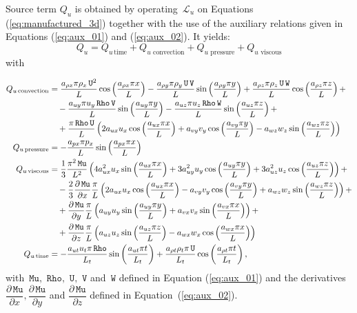 \documentclass[10pt]{article}
\newcommand{\diff}[2] {\dfrac{\partial #1}{\partial #2}}
\newcommand{\Rho}{\,\mathtt{Rho}}
\newcommand{\U}{\,\mathtt{U}}
\newcommand{\V}{\,\mathtt{V}}
\newcommand{\W}{\,\mathtt{W}}
\newcommand{\Lo}{\,\mathcal{L}}
\newcommand{\Mu}{\,\mathtt{Mu}}
\newcommand{\DMuDx}{\diff{\Mu}{x}}
\newcommand{\DMuDy}{\diff{\Mu}{y}}
\newcommand{\DMuDz}{\diff{\Mu}{z}}
\newcommand{\timee}{\,\text{time}}
\newcommand{\convection}{\,\text{convection}}
\newcommand{\viscous}{\,\text{viscous}}
\newcommand{\pressure}{\,\text{pressure}}
\begin{document}
Source term $Q_u$ is obtained by operating $\Lo_{u}$ on Equations  (\ref{eq:manufactured_3d}) together with the use of the  auxiliary relations given in Equations (\ref{eq:aux_01}) and (\ref{eq:aux_02}). It yields:
\begin{equation*}
 Q_u = Q_{u \, \text{time}}+Q_{u \, \convection}+Q_{u \, \pressure }+Q_{u \, \viscous }
\end{equation*}
with

\begin{equation*}
\begin{split}
 Q_{u \convection} &= \dfrac{a_{\rho x} \pi \rho_x \U^2 }{L} \cos\left(\dfrac{a_{\rho x} \pi x}{L}\right)
-\dfrac{a_{\rho y} \pi \rho_y \U \V }{L} \sin\left(\dfrac{a_{\rho y} \pi y}{L}\right)
+\dfrac{a_{\rho z} \pi \rho_z \U \W }{L} \cos\left(\dfrac{a_{\rho z} \pi z}{L}\right)+\\
  &\quad
-\dfrac{a_{uy} \pi u_y \Rho \V }{L} \sin\left(\dfrac{a_{uy} \pi y}{L}\right)
-\dfrac{a_{uz} \pi u_z \Rho \W }{L} \sin\left(\dfrac{a_{uz} \pi z}{L}\right)+\\
  &\quad
+\dfrac{\pi \Rho \U}{L} \left(2 a_{ux} u_x \cos\left(\dfrac{a_{ux} \pi x}{L}\right)+a_{vy} v_y \cos\left(\dfrac{a_{vy} \pi y}{L}\right)-a_{wz} w_z \sin\left(\dfrac{a_{wz} \pi z}{L}\right)\right)  \\ \vspace{15pt}
%
Q_{u \pressure} &= -\dfrac{a_{px} \pi p_x}{L} \sin\left(\dfrac{a_{px} \pi x}{L}\right) \\ \vspace{15pt}
%
Q_{u \viscous} &= \dfrac{1}{3} \dfrac{\pi^2 \Mu}{L^2}\left(4 a_{ux}^2 u_x \sin\left(\dfrac{a_{ux} \pi x}{L}\right)+3 a_{uy}^2 u_y \cos\left(\dfrac{a_{uy} \pi y}{L}\right)+3 a_{uz}^2 u_z \cos\left(\dfrac{a_{uz} \pi z}{L}\right)\right) +\\
  &\quad - \dfrac{2}{3}  \DMuDx \dfrac{\pi}{L}\left(2 a_{ux} u_x \cos\left(\dfrac{a_{ux} \pi x}{L}\right)-a_{vy} v_y \cos\left(\dfrac{a_{vy} \pi y}{L}\right)+a_{wz} w_z \sin\left(\dfrac{a_{wz} \pi z}{L}\right)\right) +\\
  &\quad + \DMuDy \dfrac{\pi}{L}\left(a_{uy} u_y \sin\left(\dfrac{a_{uy} \pi y}{L}\right)+a_{vx} v_x \sin\left(\dfrac{a_{vx} \pi x}{L}\right)\right)  +\\
  &\quad +  \DMuDz \dfrac{\pi}{L}\left(a_{uz} u_z \sin\left(\dfrac{a_{uz} \pi z}{L}\right)-a_{wx} w_x \cos\left(\dfrac{a_{wx} \pi x}{L}\right)\right)  \\ \vspace{15pt}
%
Q_{u \timee} &= -\dfrac{a_{ut} u_t \pi \Rho }{L_t} \sin\left(\dfrac{a_{ut} \pi t}{L_t}\right) +\dfrac{a_{\rho t} \rho_t \pi \U }{L_t} \cos\left(\dfrac{a_{\rho t} \pi t}{L_t}\right),
\end{split}
\end{equation*}
%
with $\Mu,\, \Rho,\,\U,\,\V$ and $\W$  defined in Equation (\ref{eq:aux_01}) and the derivatives $\DMuDx,\DMuDy$ and $\DMuDz$ defined in Equation~(\ref{eq:aux_02}).
\end{document}
